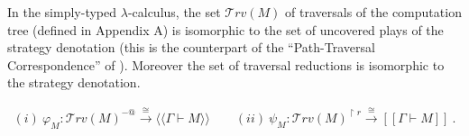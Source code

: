 \documentclass{llncs}
\newcommand\travset{\mathcal{T}rv}
\newcommand{\sem}[1]{{[\![ #1 ]\!]}}
\newcommand{\intersem}[1]{{\langle\!\langle #1 \rangle\!\rangle}}
\begin{document}
In the simply-typed $\lambda$-calculus, the set $\travset(M)$ of
traversals of the computation tree (defined in Appendix A) is
isomorphic to the set of uncovered plays of the strategy denotation
(this is the counterpart of the ``Path-Traversal Correspondence'' of
\cite{OngLics2006}). Moreover the set of traversal reductions is
isomorphic to the strategy denotation.

\begin{theorem}
\label{thm:correspondence}
\begin{eqnarray*}
(i) \  \varphi_M  : \travset(M)^{-@} \stackrel{\cong}{\longrightarrow} \intersem{\Gamma \vdash M} \qquad
(ii) \  \psi_M  : \travset(M)^{\upharpoonright r} \stackrel{\cong}{\longrightarrow} \sem{\Gamma \vdash M} \ .
\end{eqnarray*}
\end{theorem}
\end{document}
